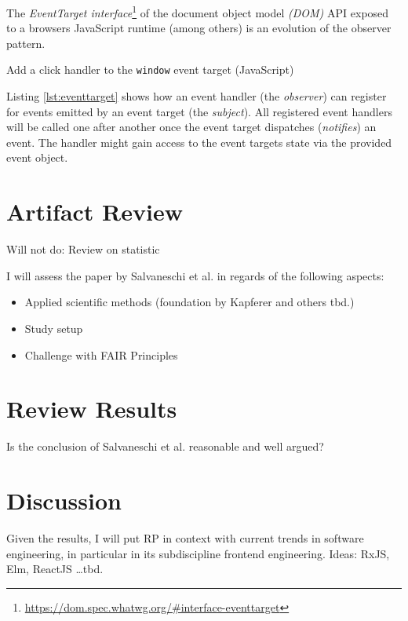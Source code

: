 \documentclass[12pt,a4paper]{article}
\begin{document}
The \emph{EventTarget interface}\footnote{\url{https://dom.spec.whatwg.org/\#interface-eventtarget}} of the document object model \emph{(DOM)} API exposed to a browsers JavaScript runtime (among others) is an evolution of the observer pattern.

\begin{listing}[H]
	\caption{Add a click handler to the \texttt{window} event target (JavaScript)}
	\label{lst:eventtarget}
\end{listing}

Listing \ref{lst:eventtarget} shows how an event handler (the \emph{observer}) can register for events emitted by an event target (the \emph{subject}). All registered event handlers will be called one after another once the event target dispatches (\emph{notifies}) an event. The handler might gain access to the event targets state via the provided event object.


\section{Artifact Review}
Will not do: Review on statistic

I will assess the paper by Salvaneschi et al. \cite{7827078} in regards of the following aspects:
\begin{itemize}
	\item Applied scientific methods (foundation by Kapferer \cite{kapferer:2019:empirical} and others tbd.)
	\item Study setup
	\item Challenge with FAIR Principles \cite{2019arXiv190805986H} \cite{wilkinson:2016}
\end{itemize}



\section{Review Results}
Is the conclusion of Salvaneschi et al. \cite{7827078} reasonable and well argued?



\section{Discussion}
Given the results, I will put RP in context with current trends in software engineering, in particular in its subdiscipline frontend engineering.
Ideas: RxJS, Elm, ReactJS \dots tbd.
\end{document}
